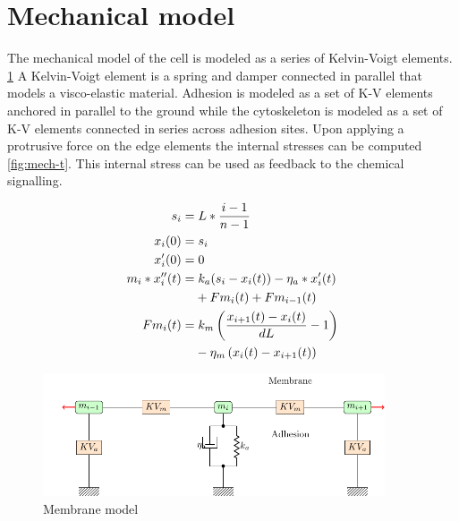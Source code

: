 \documentclass{article}
\begin{document}
\section{Mechanical model}

The mechanical model of the cell is modeled as a series of Kelvin-Voigt
elements.  \cref{fig:tension_fig}
A Kelvin-Voigt element is a spring and damper connected in parallel that models
a visco-elastic material. Adhesion is modeled as a set of K-V elements anchored
in parallel to the ground while the cytoskeleton is modeled as a set of K-V
elements connected in series across adhesion sites. Upon applying a protrusive
force on the edge elements the internal stresses can be computed
\cref{fig:mech-t}. This internal stress can be used as feedback to the chemical
signalling.


\begin{align}
    s_i     &= L * \frac{ i-1 }{ n-1 }  \\
    x_i(0)  &= s_i \\
    x'_i(0) &= 0 \\
    m_i * x''_i(t) &= k_a (s_i - x_i(t)) - \eta_a * x_i'(t)  \\
                   &\phantom{{}=}+ Fm_i(t) + Fm_{i-1}(t) \notag \\
    Fm_i(t) &= k_m \left( \frac{ x_{i+1}(t) - x_i(t) }{ dL } - 1 \right)  \\
            &\phantom{{}=} - \eta_m \left(x_i(t) - x_{i+1}(t) \right) \notag
\end{align}

\begin{figure}
    \centering
    \includegraphics[width=0.9\textwidth]{./tension_fig.pdf}
    \caption{Membrane model \label{fig:tension_fig}}
\end{figure}
\end{document}
